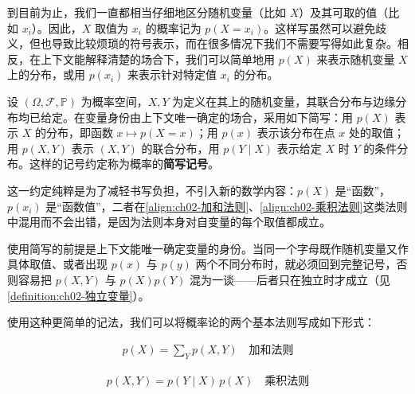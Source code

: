 \documentclass[../../main.tex]{subfiles}
\begin{document}
到目前为止，我们一直都相当仔细地区分随机变量（比如 $X$）及其可取的值（比如 $x_i$）。因此，$X$ 取值为 $x_i$ 的概率记为 $p(X=x_i)$。这样写虽然可以避免歧义，但也导致比较烦琐的符号表示，而在很多情况下我们不需要写得如此复杂。相反，在上下文能解释清楚的场合下，我们可以简单地用 $p(X)$ 来表示随机变量 $X$ 上的分布，或用 $p(x_i)$ 来表示针对特定值 $x_i$ 的分布。

\begin{definition}[概率的简写记号]\label{definition:ch02-简写记号}
设 $(\Omega,\mathcal{F},\mathbb{P})$ 为概率空间，$X,Y$ 为定义在其上的随机变量，其联合分布与边缘分布均已给定。在变量身份由上下文唯一确定的场合，采用如下简写：用 $p(X)$ 表示 $X$ 的分布，即函数 $x\mapsto p(X=x)$；用 $p(x)$ 表示该分布在点 $x$ 处的取值；用 $p(X,Y)$ 表示 $(X,Y)$ 的联合分布，用 $p(Y\mid X)$ 表示给定 $X$ 时 $Y$ 的条件分布。这样的记号约定称为概率的\textbf{简写记号}。
\end{definition}

\begin{remark}
这一约定纯粹是为了减轻书写负担，不引入新的数学内容：$p(X)$ 是“函数”，$p(x_i)$ 是“函数值”，二者在\eqref{align:ch02-加和法则}、\eqref{align:ch02-乘积法则}这类法则中混用而不会出错，是因为法则本身对自变量的每个取值都成立。

使用简写的前提是上下文能唯一确定变量的身份。当同一个字母既作随机变量又作具体取值、或者出现 $p(x)$ 与 $p(y)$ 两个不同分布时，就必须回到完整记号，否则容易把 $p(X,Y)$ 与 $p(X)p(Y)$ 混为一谈——后者只在独立时才成立（见\cref{definition:ch02-独立变量}）。
\end{remark}

使用这种更简单的记法，我们可以将概率论的两个基本法则写成如下形式：

\begin{align}
  p(X) = \sum_{Y} p(X,Y) \quad \text{加和法则}
  \label{align:ch02-加和法则}
\end{align}

\begin{align}
  p(X,Y) = p(Y\mid X)\,p(X) \quad \text{乘积法则}
  \label{align:ch02-乘积法则}
\end{align}
\end{document}
